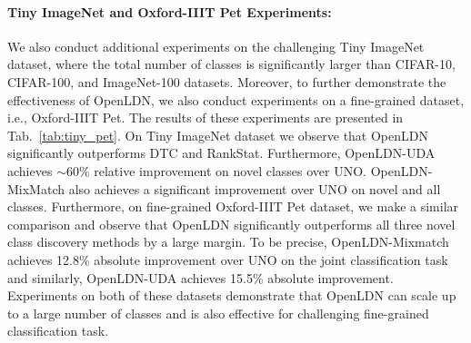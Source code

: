 \documentclass[runningheads]{eccv2022submission}
\begin{document}
\paragraph{\textbf{Tiny ImageNet and Oxford-IIIT Pet Experiments:}} We also conduct additional experiments on the challenging Tiny ImageNet dataset, where the total number of classes is significantly larger than CIFAR-10, CIFAR-100, and ImageNet-100 datasets. Moreover, to further demonstrate the effectiveness of OpenLDN, we also conduct experiments on a fine-grained dataset, i.e., Oxford-IIIT Pet. The results of these experiments are presented in Tab.~\ref{tab:tiny_pet}. On Tiny ImageNet dataset we observe that OpenLDN significantly outperforms DTC and RankStat. Furthermore, OpenLDN-UDA achieves $\sim$60\% relative improvement on novel classes over UNO. OpenLDN-MixMatch also achieves a significant improvement over UNO on novel and all classes. Furthermore, on fine-grained Oxford-IIIT Pet dataset, we make a similar comparison and observe that OpenLDN significantly outperforms all three novel class discovery methods by a large margin. To be precise, OpenLDN-Mixmatch achieves 12.8\% absolute improvement over UNO on the joint classification task and similarly, OpenLDN-UDA achieves 15.5\% absolute improvement. Experiments on both of these datasets demonstrate that OpenLDN can scale up to a large number of classes and is also effective for challenging fine-grained classification task.      
\end{document}
